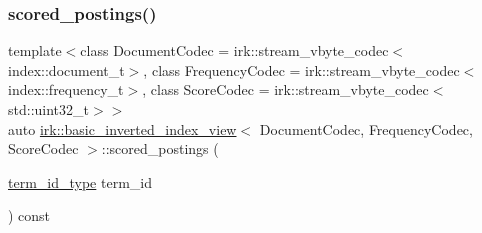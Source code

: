 \mbox{\label{classirk_1_1basic__inverted__index__view_ae49eebb12342ae4847a4b25a94636fba}} 
\subsubsection{\texorpdfstring{scored\+\_\+postings()}{scored\_postings()}\hspace{0.1cm}{\footnotesize\ttfamily [1/2]}}
{\footnotesize\ttfamily template$<$class Document\+Codec  = irk\+::stream\+\_\+vbyte\+\_\+codec$<$index\+::document\+\_\+t$>$, class Frequency\+Codec  = irk\+::stream\+\_\+vbyte\+\_\+codec$<$index\+::frequency\+\_\+t$>$, class Score\+Codec  = irk\+::stream\+\_\+vbyte\+\_\+codec$<$std\+::uint32\+\_\+t$>$$>$ \\
auto \mbox{\hyperlink{classirk_1_1basic__inverted__index__view}{irk\+::basic\+\_\+inverted\+\_\+index\+\_\+view}}$<$ Document\+Codec, Frequency\+Codec, Score\+Codec $>$\+::scored\+\_\+postings (\begin{DoxyParamCaption}\item[{\mbox{\hyperlink{classirk_1_1basic__inverted__index__view_a6b272abc76df208ce59bac93810e7331}{term\+\_\+id\+\_\+type}}}]{term\+\_\+id }\end{DoxyParamCaption}) const\hspace{0.3cm}{\ttfamily [inline]}}

\mbox{\label{classirk_1_1basic__inverted__index__view_acd6baa5b98edddbb2f560bcd713be44b}} 
